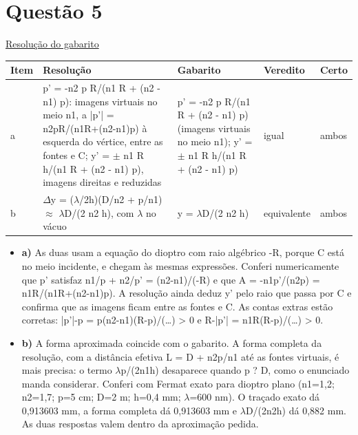 \documentclass{article}%
\begin{document}
\section*{Questão 5}%
\href{https://poliedroresolve.sistemapoliedro.com.br/vestibulares/ita/2027/ita-2-fase-dia-3-22-10-2026-2-fase-dia-3/dissertativa-5-fisica-2-fase-dia-3-ita-2027}{Resolução do gabarito}\par\smallskip%
\begin{longtable}{@{}p{} p{} p{} p{} p{}@{}}\toprule Item & Resolução & Gabarito & Veredito & Certo \\ \midrule
a & p' = -n2 p R/(n1 R + (n2 - n1) p): imagens virtuais no meio n1, a |p'| = n2pR/(n1R+(n2-n1)p) à esquerda do vértice, entre as fontes e C; y' = $\pm$ n1 R h/(n1 R + (n2 - n1) p), imagens direitas e reduzidas & p' = -n2 p R/(n1 R + (n2 - n1) p) (imagens virtuais no meio n1); y' = $\pm$ n1 R h/(n1 R + (n2 - n1) p) & igual & ambos \\
b & $\Delta$y = ($\lambda$/2h)(D/n2 + p/n1) $\approx$ $\lambda$D/(2 n2 h), com $\lambda$ no vácuo & y = $\lambda$D/(2 n2 h) & equivalente & ambos \\
\bottomrule\end{longtable}%
\begin{itemize}%
\item%
\textbf{a)} As duas usam a equação do dioptro com raio algébrico -R, porque C está no meio incidente, e chegam às mesmas expressões. Conferi numericamente que p' satisfaz n1/p + n2/p' = (n2-n1)/(-R) e que A = -n1p'/(n2p) = n1R/(n1R+(n2-n1)p). A resolução ainda deduz y' pelo raio que passa por C e confirma que as imagens ficam entre as fontes e C. As contas extras estão corretas: |p'|-p = p(n2-n1)(R-p)/(\ldots{}) > 0 e R-|p'| = n1R(R-p)/(\ldots{}) > 0.%
\item%
\textbf{b)} A forma aproximada coincide com o gabarito. A forma completa da resolução, com a distância efetiva L = D + n2p/n1 até as fontes virtuais, é mais precisa: o termo $\lambda$p/(2n1h) desaparece quando p ? D, como o enunciado manda considerar. Conferi com Fermat exato para dioptro plano (n1=1,2; n2=1,7; p=5 cm; D=2 m; h=0,4 mm; $\lambda$=600 nm). O traçado exato dá 0,913603 mm, a forma completa dá 0,913603 mm e $\lambda$D/(2n2h) dá 0,882 mm. As duas respostas valem dentro da aproximação pedida.%
\end{itemize}%
\end{document}
